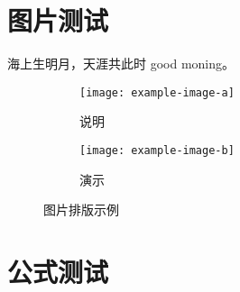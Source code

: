 \zhlipsum[4]

\section{图片测试}

海上生明月，天涯共此时 good moning。
\zhlipsum[1]


\begin{figure}[h!]
	\centering
	\begin{subfigure}{0.4\linewidth}
		\centering
		\texttt{[image: example-image-a]}
		\caption{说明}\label{}
	\end{subfigure}
	\hfil
	\begin{subfigure}{0.4\linewidth}
		\centering
		\texttt{[image: example-image-b]}
		\caption{演示}\label{}
	\end{subfigure}
	\caption{图片排版示例}
\end{figure}

\section{公式测试}

